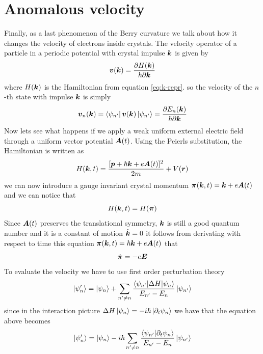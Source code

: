 \section{Anomalous velocity}
Finally, as a last phenomenon of the Berry curvature we talk about how it changes the velocity of electrons inside crystals. The velocity operator of a particle in a periodic potential with crystal impulse $\boldsymbol{k}$ is given by \cite{grosso2013solid}
\begin{equation}
    \boldsymbol{v}(\boldsymbol{k})= \frac{\partial H(\boldsymbol{k})}{\hbar \partial \boldsymbol{k}}
    \label{eq:cryspeed}
\end{equation}
where $H(\boldsymbol{k})$ is the Hamiltonian from equation \ref{eq:k-repr}. so the velocity of the $n$-th state with impulse $\boldsymbol{k}$ is simply
\begin{equation}
    \boldsymbol{v}_n(\boldsymbol{k})=\bra{\psi_{n'}}\boldsymbol{v}(\boldsymbol{k})\ket{\psi_{n'}}=\frac{\partial E_n(\boldsymbol{k})}{\hbar \partial \boldsymbol{k}}
\end{equation}
Now lets see what happens if we apply a weak uniform external electric field through a uniform vector potential $\boldsymbol{A}(t)$. Using the Peierls substitution, the Hamiltonian is written as 
\begin{equation}
    H(\boldsymbol{k},t)= \frac{[\boldsymbol{p}+\hbar\boldsymbol{k} +e\boldsymbol{A}(t)]^2}{2m}+V(\boldsymbol{r})
\end{equation}
we can now introduce a gauge invariant crystal momentum $\boldsymbol{\pi}(\boldsymbol{k}, t)=\boldsymbol{k} +e\boldsymbol{A}(t)$ and we can notice that
\begin{equation}
    H(\boldsymbol{k},t)=H(\boldsymbol{\pi})
\end{equation}
Since $\boldsymbol{A} (t)$ preserves the translational symmetry, $\boldsymbol{k}$ is still a good quantum number and it is a constant of motion $\dot{\boldsymbol{k}}=0$ it follows from derivating with respect to time this equation $\boldsymbol{\pi}(\boldsymbol{k}, t)=\hbar \boldsymbol{k} +e\boldsymbol{A}(t)$ that
\begin{equation}
   \dot{\boldsymbol{\pi}}=-e \boldsymbol{E}
   \label{eq:pidt}
\end{equation}
To evaluate the velocity we have to use first order perturbation theory \cite{thouless1983quantization}
\begin{equation}
    \ket{\psi'_n}=\ket{\psi_n}+\sum_{n'\neq n}\frac{\braket{\psi_{n'}}{\Delta H|\psi_n}}{E_{n'}-E_n}\ket{\psi_{n'}}
\end{equation}
since in the interaction picture $\Delta H\ket{\psi_n}=-i\hbar\ket{\partial_t\psi_n}$
we have that the equation above becomes
\begin{equation}
    \ket{\psi'_n}=\ket{\psi_n}-i\hbar\sum_{n'\neq n}\frac{\braket{\psi_{n'}}{\partial_t\psi_n}}{E_{n'}-E_n}\ket{\psi_{n'}}
\end{equation}
